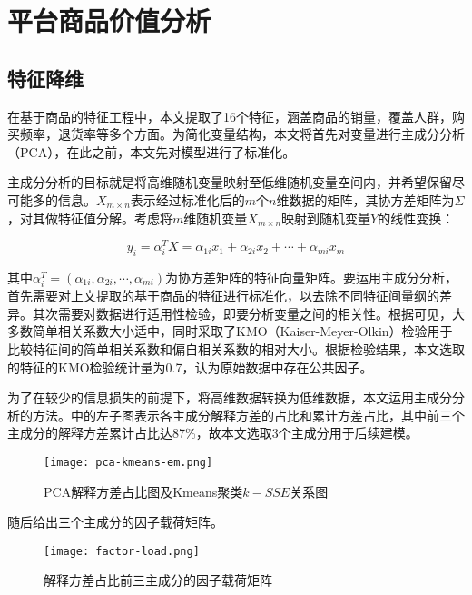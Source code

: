 \documentclass[lang=cn,11pt,a4paper,cite=authoryear]{elegantpaper}
\begin{document}
\section{平台商品价值分析}

\subsection{特征降维}

在基于商品的特征工程中，本文提取了16个特征，涵盖商品的销量，覆盖人群，购买频率，退货率等多个方面。为简化变量结构，本文将首先对变量进行主成分分析（PCA），在此之前，本文先对模型进行了标准化。

主成分分析的目标就是将高维随机变量映射至低维随机变量空间内，并希望保留尽可能多的信息。$X_{m \times n}$表示经过标准化后的$m$个$n$维数据的矩阵，其协方差矩阵为$\Sigma$，对其做特征值分解。考虑将$m$维随机变量$X_{m \times n}$映射到随机变量$Y$的线性变换：

\begin{equation}
  y_i = \alpha_{i}^T X = \alpha_{1i}x_1 +\alpha_{2i} x_2 + \cdots + \alpha_{mi} x_m
\end{equation}

其中$\alpha_i^T = (\alpha_{1i}, \alpha_{2i}, \cdots, \alpha_{mi})$为协方差矩阵的特征向量矩阵。要运用主成分分析，首先需要对上文提取的基于商品的特征进行标准化，以去除不同特征间量纲的差异。其次需要对数据进行适用性检验，即要分析变量之间的相关性。根据可见，大多数简单相关系数大小适中，同时采取了KMO（Kaiser-Meyer-Olkin）检验用于比较特征间的简单相关系数和偏自相关系数的相对大小。根据检验结果，本文选取的特征的KMO检验统计量为0.7，认为原始数据中存在公共因子。

为了在较少的信息损失的前提下，将高维数据转换为低维数据，本文运用主成分分析的方法。中的左子图表示各主成分解释方差的占比和累计方差占比，其中前三个主成分的解释方差累计占比达87\%，故本文选取3个主成分用于后续建模。
\begin{figure}[H]
  \centering
  \texttt{[image: pca-kmeans-em.png]}
  \caption{PCA解释方差占比图及Kmeans聚类$k-SSE$关系图}
  \label{主成分聚类}
\end{figure}

随后给出三个主成分的因子载荷矩阵。
\begin{figure}[H]
  \centering
  \texttt{[image: factor-load.png]}
  \caption{解释方差占比前三主成分的因子载荷矩阵}
  \label{因子载荷矩阵}
\end{figure}
\end{document}
